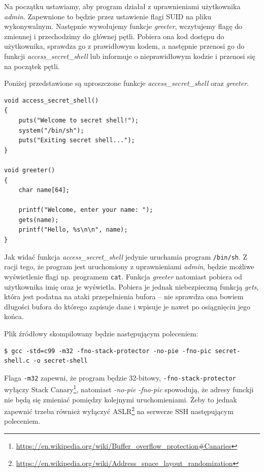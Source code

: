 \documentclass[language=polish,type=eng]{aghmodern}
\begin{document}
Na początku ustawiamy, aby program działał z uprawnieniami użytkownika \emph{admin}.
Zapewnione to będzie przez ustawienie flagi SUID na pliku wykonywalnym.
Następnie wywołujemy funkcje \emph{greeter}, wczytujemy flagę do zmiennej i przechodzimy
do głównej pętli. Pobiera ona kod dostępu do użytkownika, sprawdza go z prawidłowym kodem,
a następnie przenosi go do funkcji \emph{access\_secret\_shell} lub informuje o
nieprawidłowym kodzie i przenosi się na początek pętli.

Poniżej przedstawione są uproszczone funkcje \emph{access\_secret\_shell} oraz \emph{greeter}.

\begin{verbatim}
void access_secret_shell()
{
    puts("Welcome to secret shell!");
    system("/bin/sh");
    puts("Exiting secret shell...");
}

void greeter()
{
    char name[64];

    printf("Welcome, enter your name: ");
    gets(name);
    printf("Hello, %s\n\n", name);
}
\end{verbatim}

Jak widać funkcja \emph{access\_secret\_shell} jedynie uruchamia program \texttt{/bin/sh}.
Z racji tego, że program jest uruchomiony z uprawnieniami \emph{admin}, będzie możliwe
wyświetlenie flagi np. programem \texttt{cat}.
Funkcja \emph{greeter} natomiast pobiera od użytkownika imię oraz je wyświetla.
Pobiera je jednak niebezpieczną funkcją \emph{gets}, która jest podatna na ataki
przepełnienia bufora -- nie sprawdza ona bowiem długości bufora do którego zapisuje dane i wpisuje
je nawet po osiągnięciu jego końca.

Plik źródłowy skompilowany będzie następującym poleceniem:

\begin{verbatim}
$ gcc -std=c99 -m32 -fno-stack-protector -no-pie -fno-pic secret-shell.c -o secret-shell
\end{verbatim}

Flaga \texttt{-m32} zapewni, że program będzie 32-bitowy,
\texttt{-fno-stack-protector} wyłączy Stack Canary\footnote{
\url{https://en.wikipedia.org/wiki/Buffer_overflow_protection\#Canaries}},
natomiast \emph{-no-pie -fno-pic} spowodują, że adresy funckji nie będą się zmieniać
pomiędzy kolejnymi uruchomieniami. Żeby to jednak zapewnić trzeba również wyłączyć
ASLR\footnote{\url{https://en.wikipedia.org/wiki/Address_space_layout_randomization}}
na serwerze SSH następującym poleceniem.
\end{document}

